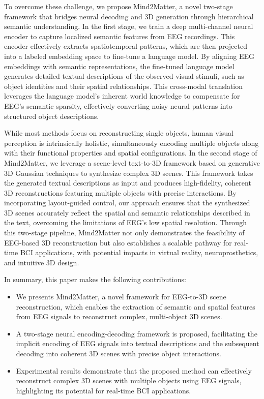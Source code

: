 \documentclass[sigconf]{acmart}
\begin{document}
To overcome these challenge, we propose Mind2Matter, a novel two-stage framework that bridges neural decoding and 3D generation through hierarchical semantic understanding. In the first stage, we train a deep multi-channel neural encoder to capture localized semantic features from EEG recordings. This encoder effectively extracts spatiotemporal patterns, which are then projected into a labeled embedding space to fine-tune a language model. By aligning EEG embeddings with semantic representations, the fine-tuned language model generates detailed textual descriptions of the observed visual stimuli, such as object identities and their spatial relationships. This cross-modal translation leverages the language model's inherent world knowledge \cite{cai2025bayesian,li2024cpseg} to compensate for EEG's semantic sparsity, effectively converting noisy neural patterns into structured object descriptions.

While most methods focus on reconstructing single objects, human visual perception is intrinsically holistic, simultaneously encoding multiple objects along with their functional properties and spatial configurations. In the second stage of Mind2Matter, we leverage a scene-level text-to-3D framework based on generative 3D Gaussian techniques \cite{chen2024scalinggaussian,liu2024graph,yan20243dsceneeditor} to synthesize complex 3D scenes. This framework takes the generated textual descriptions as input and produces high-fidelity, coherent 3D reconstructions featuring multiple objects with precise interactions. By incorporating layout-guided control, our approach ensures that the synthesized 3D scenes accurately reflect the spatial and semantic relationships described in the text, overcoming the limitations of EEG’s low spatial resolution. Through this two-stage pipeline, Mind2Matter not only demonstrates the feasibility of EEG-based 3D reconstruction but also establishes a scalable pathway for real-time BCI applications, with potential impacts in virtual reality, neuroprosthetics, and intuitive 3D design.

In summary, this paper makes the following contributions:
\begin{itemize}
\item We presents Mind2Matter, a novel framework for EEG-to-3D scene reconstruction, which enables the extraction of semantic and spatial features from EEG signals to reconstruct complex, multi-object 3D scenes.
\item A two-stage neural encoding-decoding framework is proposed, facilitating the implicit encoding of EEG signals into textual descriptions and the subsequent decoding into coherent 3D scenes with precise object interactions.
\item Experimental results demonstrate that the proposed method can effectively reconstruct complex 3D scenes with multiple objects using EEG signals, highlighting its potential for real-time BCI applications.
\end{itemize}
\end{document}
